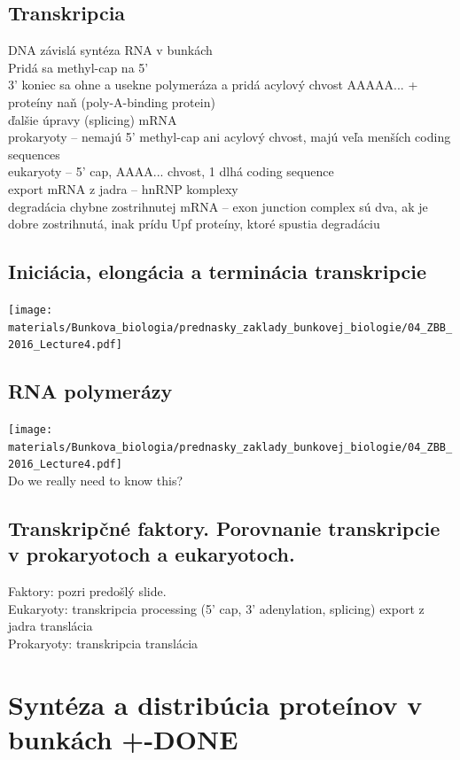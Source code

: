 \subsection{Transkripcia}
DNA závislá syntéza RNA v bunkách\\
Pridá sa methyl-cap na 5'\\
3' koniec sa ohne a usekne \ra polymeráza a pridá acylový chvost AAAAA... + proteíny naň (poly-A-binding protein)\\
ďalšie úpravy (splicing) mRNA\\
prokaryoty -- nemajú 5' methyl-cap ani acylový chvost, majú veľa menších coding sequences\\
eukaryoty -- 5' cap, AAAA... chvost, 1 dlhá coding sequence\\
export mRNA z jadra -- hnRNP komplexy\\
degradácia chybne zostrihnutej mRNA -- exon junction complex sú dva, ak je dobre zostrihnutá, inak prídu Upf proteíny, ktoré spustia degradáciu\\
\subsection{Iniciácia, elongácia a terminácia transkripcie}
\texttt{[image: materials/Bunkova\_biologia/prednasky\_zaklady\_bunkovej\_biologie/04\_ZBB\_2016\_Lecture4.pdf]}\\
\subsection{RNA polymerázy}
\texttt{[image: materials/Bunkova\_biologia/prednasky\_zaklady\_bunkovej\_biologie/04\_ZBB\_2016\_Lecture4.pdf]}\\
Do we really need to know this?\\
\subsection{Transkripčné faktory. Porovnanie transkripcie v prokaryotoch a eukaryotoch.}
Faktory: pozri predošlý slide.\\
Eukaryoty: transkripcia \ra processing (5' cap, 3' adenylation, splicing) \ra export z jadra \ra translácia\\
Prokaryoty: transkripcia \ra translácia\\

\section{Syntéza a distribúcia proteínov v bunkách +-DONE}

